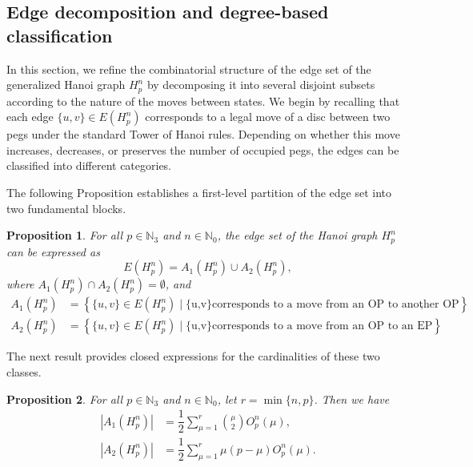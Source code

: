 \documentclass[letterpaper,12pt]{article}
\newtheorem{proposition}{Proposition}
\begin{document}
\subsection{Edge decomposition and degree-based classification}

In this section, we refine the combinatorial structure of the edge set of the generalized Hanoi graph $H_p^n$ by decomposing it into several disjoint subsets according to the nature of the moves between states.  
We begin by recalling that each edge $\{u,v\} \in E(H_p^n)$ corresponds to a legal move of a disc between two pegs under the standard Tower of Hanoi rules.  
Depending on whether this move increases, decreases, or preserves the number of occupied pegs, the edges can be classified into different categories.


\noindent
The following Proposition establishes a first-level partition of the edge set into two fundamental blocks.

\begin{proposition}\label{prop:two-block}
For all $p \in \mathbb{N}_3$ and $n \in \mathbb{N}_0$, the edge set of the Hanoi graph $H_p^n$ can be expressed as
\begin{equation}
    E(H_p^n) = A_1(H_p^n) \cup A_2(H_p^n),
\end{equation}
where $A_1(H_p^n)\cap  A_2(H_p^n)=\emptyset$, and
\begin{align}
     A_1(H_p^n)&=\left\{\{u,v\}\in E(H_p^n) \mid \text{\{u,v\} corresponds to a move from an OP to another OP} \right\},\\
     A_2(H_p^n)&=\left\{\{u,v\}\in E(H_p^n) \mid \text{\{u,v\} corresponds to a move from an OP to an EP} \right\}.
\end{align}
\end{proposition}

The next result provides closed expressions for the cardinalities of these two classes.

\begin{proposition}\label{prop:AA}
For all $p \in \mathbb{N}_3$ and $n \in \mathbb{N}_0$,  let $r = \min\{n, p\}$. Then we have
\begin{align}
     |A_1(H_p^n)|&=\dfrac{1}{2}\sum_{\mu=1}^{r}\binom{\mu}{2}O_p^n(\mu),\\
     |A_2(H_p^n)|&=\dfrac{1}{2}\sum_{\mu=1}^{r}\mu(p-\mu)O_p^n(\mu).
\end{align}
\end{proposition}
\end{document}
